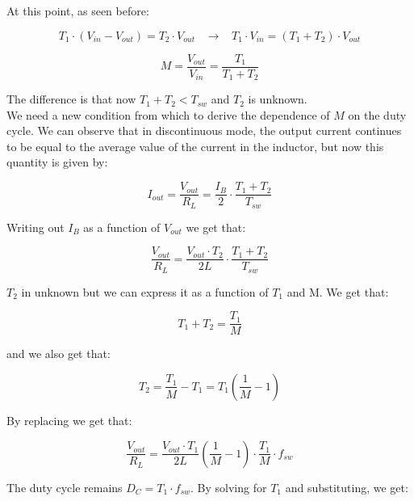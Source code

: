 \documentclass[../main.tex]{subfiles}
\begin{document}
At this point, as seen before:

\begin{equation}
	T_1 \cdot (V_{in} - V_{out}) = T_2 \cdot V_{out} \hspace{10pt} \longrightarrow \hspace{10pt} T_1 \cdot V_{in} = (T_1 + T_2) \cdot V_{out}
\end{equation}

\begin{equation}
	M = \frac{V_{out}}{V_{in}} = \frac{T_1}{T_1 + T_2}
\end{equation}


The difference is that now $T_1 + T_2 < T_{sw}$ and $T_2$ is unknown.\\

We need a new condition from which to derive the dependence of $M$ on the duty cycle. We can observe that in discontinuous mode, the output current continues to be equal to the average value of the current in the inductor, but now this quantity is given by:

\begin{equation}
	I_{out} = \frac{V_{out}}{R_L} = \frac{I_B}{2} \cdot \frac{T_1 + T_2}{T_{sw}}	
\end{equation}

Writing out $I_B$ as a function of $V_{out}$ we get that:

\begin{equation}
	\frac{V_{out}}{R_L} = \frac{V_{out} \cdot T_2}{2L} \cdot \frac{T_1 + T_2}{T_{sw}}
\end{equation}

$T_2$ in unknown but we can express it as a function of $T_1$ and M. We get that:

\begin{equation}
	T_1 + T_2 = \frac{T_1}{M}
\end{equation}

and we also get that:

\begin{equation}
	T_2 = \frac{T_1}{M} - T_1 = T_1 \left( \frac{1}{M} - 1 \right)
\end{equation}


By replacing we get that:

\begin{equation}
	\frac{V_{out}}{R_L} = \frac{V_{out} \cdot T_1}{2L} \left( \frac{1}{M} - 1 \right) \cdot \frac{T_1}{M} \cdot f_{sw}
\end{equation}

The duty cycle remains $D_C = T_1 \cdot f_{sw}$. By solving for $T_1$ and substituting, we get:
\end{document}
